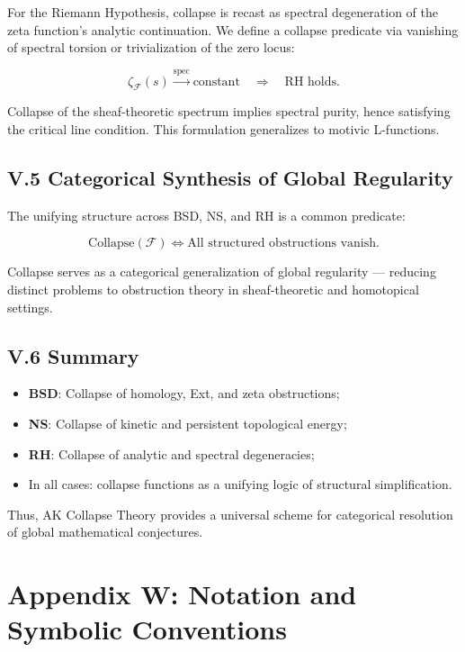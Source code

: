 \documentclass[11pt]{article}
\begin{document}
For the Riemann Hypothesis, collapse is recast as spectral degeneration of the zeta function’s analytic continuation. We define a collapse predicate via vanishing of spectral torsion or trivialization of the zero locus:

\[
\zeta_{\mathcal{F}}(s) \overset{\text{spec}}{\longrightarrow} \text{constant} \quad \Rightarrow \quad \text{RH holds}.
\]

Collapse of the sheaf-theoretic spectrum implies spectral purity, hence satisfying the critical line condition. This formulation generalizes to motivic L-functions.

\subsection*{V.5 Categorical Synthesis of Global Regularity}

The unifying structure across BSD, NS, and RH is a common predicate:

\[
\text{Collapse}(\mathcal{F}) \iff \text{All structured obstructions vanish}.
\]

Collapse serves as a categorical generalization of global regularity — reducing distinct problems to obstruction theory in sheaf-theoretic and homotopical settings.

\subsection*{V.6 Summary}

\begin{itemize}
  \item \textbf{BSD}: Collapse of homology, Ext, and zeta obstructions;
  \item \textbf{NS}: Collapse of kinetic and persistent topological energy;
  \item \textbf{RH}: Collapse of analytic and spectral degeneracies;
  \item In all cases: collapse functions as a unifying logic of structural simplification.
\end{itemize}

Thus, AK Collapse Theory provides a universal scheme for categorical resolution of global mathematical conjectures.



\appendix
\section*{Appendix W: Notation and Symbolic Conventions}
\end{document}
